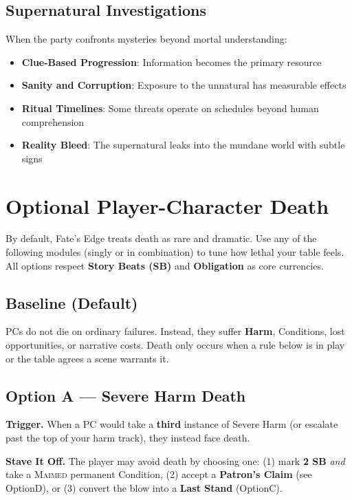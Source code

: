 \subsection*{Supernatural Investigations}

When the party confronts mysteries beyond mortal understanding:

\begin{itemize}
    \item \textbf{Clue-Based Progression}: Information becomes the primary resource
    \item \textbf{Sanity and Corruption}: Exposure to the unnatural has measurable effects
    \item \textbf{Ritual Timelines}: Some threats operate on schedules beyond human comprehension
    \item \textbf{Reality Bleed}: The supernatural leaks into the mundane world with subtle signs
\end{itemize}



\section{Optional Player-Character Death}\label{sec:pc-death-optional}

By default, Fate’s Edge treats death as rare and dramatic. Use any of the following modules (singly or in combination) to tune how lethal your table feels. All options respect \textbf{Story Beats (SB)} and \textbf{Obligation} as core currencies.

\subsection*{Baseline (Default)}\label{subsec:death-baseline}
PCs do not die on ordinary failures. Instead, they suffer \textbf{Harm}, Conditions, lost opportunities, or narrative costs. Death only occurs when a rule below is in play or the table agrees a scene warrants it.

\subsection*{Option A — Severe Harm Death}\label{subsec:death-severe}
\textbf{Trigger.} When a PC would take a \textbf{third} instance of Severe Harm (or escalate past the top of your harm track), they instead face death.\par
\textbf{Stave It Off.} The player may avoid death by choosing one: (1) mark \textbf{2 SB} \emph{and} take a \textsc{Maimed} permanent Condition, (2) accept a \textbf{Patron’s Claim} (see OptionD), or (3) convert the blow into a \textbf{Last Stand} (OptionC).

